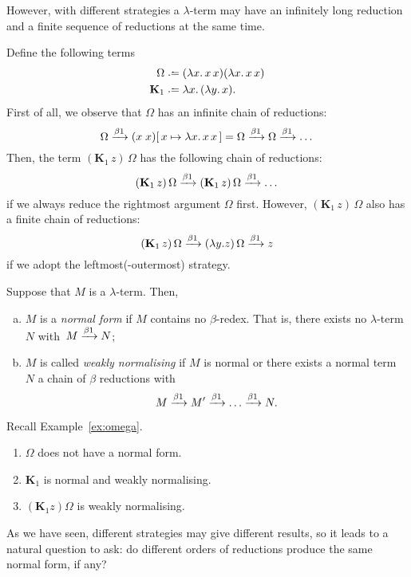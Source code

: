 However, with different strategies a $\lambda$-term may have an infinitely long
reduction and a finite sequence of reductions at the same time. 
\begin{example} \label{ex:omega}
  Define the following terms
  \begin{align*}
    \Omega &\defeq (\lambda x.\, x\,x)(\lambda x.\,x\,x) \\
    \mathbf{K}_1 & \defeq \lambda x.\,(\lambda y.\, x).
  \end{align*}
  First of all, we observe that $\Omega$ has an infinite chain of reductions:
  \[
    \Omega \xrightarrow{\beta1} (x\;x)[\,x\mapsto\lambda x.\, x\,x\,] = \Omega 
    \xrightarrow{\beta1}\Omega \xrightarrow{\beta1} \dots 
  \]
  Then, the term $(\mathbf{K}_1\,z)\,\Omega$ has the following
  chain of reductions:
  \[
    (\mathbf{K}_1\,z)\,\Omega
    \xrightarrow{\beta1} 
    (\mathbf{K}_1\,z)\,\Omega
    \xrightarrow{\beta1} \dots
  \]
  if we always reduce the rightmost argument $\Omega$ first.
  However, $(\mathbf{K}_1\,z)\,\Omega$ also has a finite chain of reductions:
  \[
    (\mathbf{K}_1\,z)\,\Omega
    \xrightarrow{\beta1} (\lambda y. z)\,\Omega
    \xrightarrow{\beta1} z
  \]
  if we adopt the leftmost(-outermost) strategy.

\end{example}

\begin{definition}
  Suppose that $M$ is a $\lambda$-term. Then, 
  \begin{enumerate}[(a)]
    \item $M$ is a \emph{normal form} if $M$ contains no $\beta$-redex. That is,
      there exists no $\lambda$-term $N$ with~$M \xrightarrow{\beta1} N$;
    \item $M$ is called \emph{weakly normalising} if $M$ is normal or there
      exists a normal term $N$ a chain of $\beta$ reductions with
      \[
        M \xrightarrow{\beta1} M' \xrightarrow{\beta1} \dots \xrightarrow{\beta1} N. 
      \]
  \end{enumerate}
\end{definition}

\begin{example}
  Recall Example~\ref{ex:omega}. 
  \begin{enumerate}
    \item $\Omega$ does not have a normal form.
    \item $\mathbf{K}_1$ is normal and weakly normalising.
    \item $(\mathbf{K}_1 z) \Omega$ is weakly normalising.
  \end{enumerate}
\end{example}
As we have seen, different strategies may give different results, so it leads to
a natural question to ask: do different orders of reductions produce the same
normal form, if any? 


